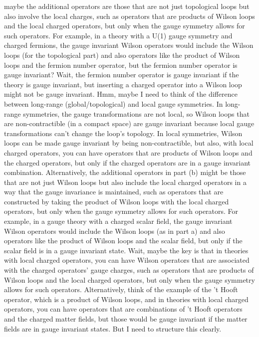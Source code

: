maybe the additional operators are those that are not just topological loops but also involve the local charges, such as operators that are products of Wilson loops and the local charged operators, but only when the gauge symmetry allows for such operators. For example, in a theory with a U(1) gauge symmetry and charged fermions, the gauge invariant Wilson operators would include the Wilson loops (for the topological part) and also operators like the product of Wilson loops and the fermion number operator, but the fermion number operator is gauge invariant? Wait, the fermion number operator is gauge invariant if the theory is gauge invariant, but inserting a charged operator into a Wilson loop might not be gauge invariant. Hmm, maybe I need to think of the difference between long-range (global/topological) and local gauge symmetries. In long-range symmetries, the gauge transformations are not local, so Wilson loops that are non-contractible (in a compact space) are gauge invariant because local gauge transformations can't change the loop's topology. In local symmetries, Wilson loops can be made gauge invariant by being non-contractible, but also, with local charged operators, you can have operators that are products of Wilson loops and the charged operators, but only if the charged operators are in a gauge invariant combination. Alternatively, the additional operators in part (b) might be those that are not just Wilson loops but also include the local charged operators in a way that the gauge invariance is maintained, such as operators that are constructed by taking the product of Wilson loops with the local charged operators, but only when the gauge symmetry allows for such operators. For example, in a gauge theory with a charged scalar field, the gauge invariant Wilson operators would include the Wilson loops (as in part a) and also operators like the product of Wilson loops and the scalar field, but only if the scalar field is in a gauge invariant state. Wait, maybe the key is that in theories with local charged operators, you can have Wilson operators that are associated with the charged operators' gauge charges, such as operators that are products of Wilson loops and the local charged operators, but only when the gauge symmetry allows for such operators. Alternatively, think of the example of the 't Hooft operator, which is a product of Wilson loops, and in theories with local charged operators, you can have operators that are combinations of 't Hooft operators and the charged matter fields, but those would be gauge invariant if the matter fields are in gauge invariant states. But I need to structure this clearly.

